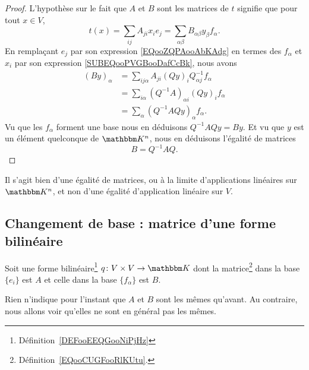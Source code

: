 \begin{proof}
    L'hypothèse sur le fait que \( A\) et \( B\) sont les matrices de \( t\) signifie que pour tout \( x\in V\),
    \begin{equation}
        t(x)=\sum_{ij}A_{ji}x_ie_j=\sum_{\alpha\beta}B_{\alpha\beta}y_{\beta}f_{\alpha}.
    \end{equation}
    En remplaçant \( e_j\) par son expression \eqref{EQooZQPAooAbKAdg} en termes des \( f_{\alpha}\) et \( x_i\) par son expression \eqref{SUBEQooPVGBooDafCcBk}, nous avons
    \begin{subequations}
        \begin{align}
            (By)_{\alpha}&=\sum_{ij\alpha}A_{ji}(Qy)_iQ^{-1}_{\alpha j}f_{\alpha}\\
            &=\sum_{i \alpha}(Q^{-1}A)_{\alpha i}(Qy)_if_{\alpha}\\
            &=\sum_{\alpha}(Q^{-1} AQy)_{\alpha}f_{\alpha}.
        \end{align}
    \end{subequations}
    Vu que les \( f_{\alpha}\) forment une base nous en déduisons \( Q^{-1}AQy=By\). Et vu que \( y\) est un élément quelconque de \( \eK^n\), nous en déduisons l'égalité de matrices
    \begin{equation}        \label{ooWKTYooOJfclT}
        B=Q^{-1}AQ.
    \end{equation}
\end{proof}
Il s'agit bien d'une égalité de matrices, ou à la limite d'applications linéaires sur \( \eK^n\), et non d'une égalité d'application linéaire sur \( V\).

\subsection{Changement de base : matrice d'une forme bilinéaire}

Soit une forme bilinéaire\footnote{Définition~\ref{DEFooEEQGooNiPjHz}} \( q\colon V\times V\to \eK\) dont la matrice\footnote{Définition~\ref{EQooCUGFooRlKUtu}.} dans la base \( \{ e_i \}\) est \( A\) et celle dans la base \( \{ f_{\alpha} \}\) est \( B\).

Rien n'indique pour l'instant que \( A\) et \( B\) sont les mêmes qu'avant. Au contraire, nous allons voir qu'elles ne sont en général pas les mêmes.

